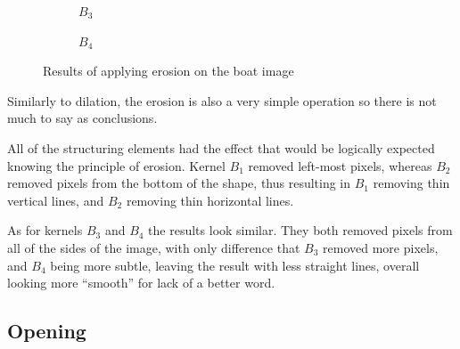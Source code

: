 \documentclass[12pt]{article}
\renewcommand{\subfiguresize}{.25\textwidth}
\begin{document}
\begin{figure}[H]
\begin{subfigure}[t]{\subfiguresize}
        \caption{$B_3$}
    \end{subfigure}
    \hspace{2em}
    \begin{subfigure}[t]{\subfiguresize}\centering
        \caption{$B_4$}
    \end{subfigure}
    \hspace{2em}
    \caption{Results of applying erosion on the boat image}
\end{figure} 

Similarly to dilation, the erosion is also a very simple operation so there is not much to say as conclusions.

All of the structuring elements had the effect that would be logically expected knowing the principle of erosion.
Kernel $B_1$ removed left-most pixels, whereas $B_2$ removed pixels from the bottom of the shape,
thus resulting in $B_1$ removing thin vertical lines, and $B_2$ removing thin horizontal lines.

As for kernels $B_3$ and $B_4$ the results look similar.
They both removed pixels from all of the sides of the image, with only difference that $B_3$ removed more pixels,
and $B_4$ being more subtle, leaving the result with less straight lines, overall looking more ``smooth'' for lack of a better word.

\subsection{Opening}
\end{document}
